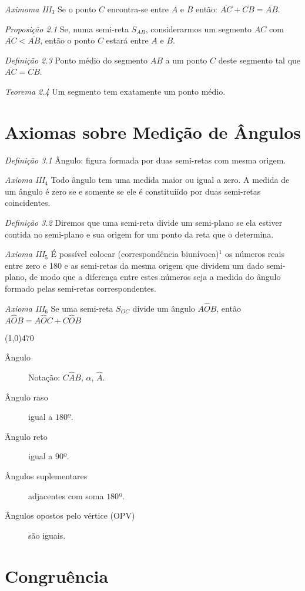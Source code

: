 \documentclass[11pt]{article}
\begin{document}
\emph{Aximoma III$_{3}$} Se o ponto $C$ encontra-se entre $A$ e $B$ então:
$\overline{AC} + \overline{CB} = \overline{AB}$.

\emph{Proposição 2.1} Se, numa semi-reta $S_{AB}$, considerarmos um segmento
$AC$ com $\overline{AC} < \overline{AB}$, então o ponto $C$ estará entre $A$ e
$B$.

\emph{Definição 2.3} Ponto médio do segmento $AB$ a um ponto $C$ deste segmento
tal que $\overline{AC} = \overline{CB}$.

\emph{Teorema 2.4} Um segmento tem exatamente um ponto médio.

\section{Axiomas sobre Medição de Ângulos}

\emph{Definição 3.1} Ângulo: figura formada por duas semi-retas com mesma
origem.

\emph{Axioma III$_{4}$} Todo ângulo tem uma medida maior ou igual a zero. A
medida de um ângulo é zero se e somente se ele é constituiído por duas
semi-retas coincidentes.

\emph{Definição 3.2} Diremos que uma semi-reta divide um semi-plano se ela
estiver contida no semi-plano e sua origem for um ponto da reta que o
determina.

\emph{Axioma III$_{5}$} É possível colocar (correspondência
biunívoca)$^1$ os números reais entre zero e 180 e as
semi-retas da mesma origem que dividem um dado semi-plano, de modo que a
diferença entre estes números seja a medida do ângulo formado pelas semi-retas
correspondentes.

\emph{Axioma III$_6$} Se uma semi-reta $S_{OC}$ divide um ângulo $A\hat{O}B$,
então $A\hat{O}B = A\hat{O}C + C\hat{O}B$

\line(1,0){470}

\begin{description}
  \item[Ângulo] Notação: $C\hat{A}B$, $\alpha$, $\hat{A}$.
  \item[Ângulo raso] igual a $180º$.
  \item[Ângulo reto] igual a $90º$.
  \item[Ângulos suplementares] adjacentes com soma $180º$.
  \item[Ângulos opostos pelo vértice (OPV)] são iguais.
\end{description}

\section{Congruência}
\end{document}
